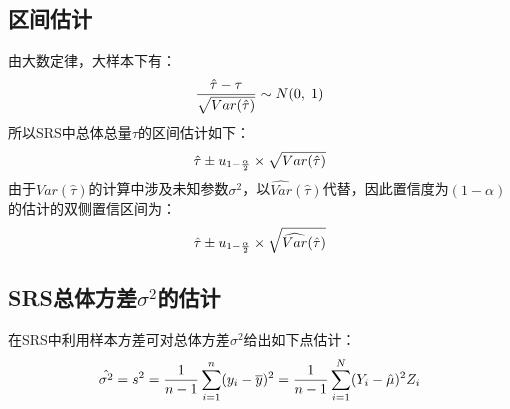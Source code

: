 \subsection*{区间估计}
\begin{theorem}
	由大数定律，大样本下有：
	\begin{equation}
		\frac{\hat{\tau}-\tau}{\sqrt{Var(\hat{\tau})}}\sim N(0,\;1)\notag
	\end{equation}
	所以SRS中总体总量$\tau$的区间估计如下：
	\begin{equation}
		\hat{\tau}\pm u_{1-\frac{\alpha}{2}}\times\sqrt{Var(\hat{\tau})}\notag
	\end{equation}
	由于$Var(\hat{\tau})$的计算中涉及未知参数$\sigma^2$，以$\widehat{Var}(\hat{\tau})$代替，因此置信度为$(1-\alpha)$的估计的双侧置信区间为：
	\begin{equation}
		\hat{\tau}\pm u_{1-\frac{\alpha}{2}}\times\sqrt{\widehat{Var}(\hat{\tau})}\notag
	\end{equation}
\end{theorem}

\subsection{SRS总体方差$\sigma^2$的估计}
\begin{definition}
	在SRS中利用样本方差可对总体方差$\sigma^2$给出如下点估计：
	\begin{equation}
		\hat{\sigma^2}=s^2=\frac{1}{n-1}\sum\limits_{i=1}^n(y_i-\overline{y})^2=\frac{1}{n-1}\sum\limits_{i=1}^N(Y_i-\hat{\mu})^2Z_i\notag
	\end{equation}
\end{definition}